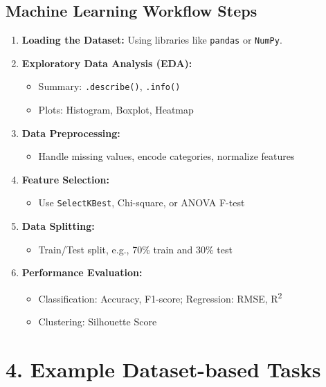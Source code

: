 \documentclass[11pt]{article}
\begin{document}
\subsection*{Machine Learning Workflow Steps}
\begin{enumerate}[label=\roman*.]
    \item \textbf{Loading the Dataset:} Using libraries like \texttt{pandas} or \texttt{NumPy}.
    \item \textbf{Exploratory Data Analysis (EDA):}
    \begin{itemize}
        \item Summary: \texttt{.describe()}, \texttt{.info()}
        \item Plots: Histogram, Boxplot, Heatmap
    \end{itemize}
    \item \textbf{Data Preprocessing:}
    \begin{itemize}
        \item Handle missing values, encode categories, normalize features
    \end{itemize}
    \item \textbf{Feature Selection:}
    \begin{itemize}
        \item Use \texttt{SelectKBest}, Chi-square, or ANOVA F-test
    \end{itemize}
    \item \textbf{Data Splitting:}
    \begin{itemize}
        \item Train/Test split, e.g., 70\% train and 30\% test
    \end{itemize}
    \item \textbf{Performance Evaluation:}
    \begin{itemize}
        \item Classification: Accuracy, F1-score; Regression: RMSE, R\textsuperscript{2}
        \item Clustering: Silhouette Score
    \end{itemize}
\end{enumerate}

\section*{4. Example Dataset-based Tasks}
\end{document}

